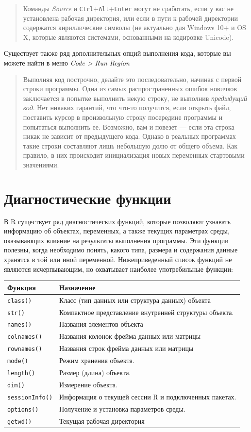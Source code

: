 \documentclass[]{book}
\begin{document}
\begin{quote}
Команды \emph{Source} и \texttt{Ctrl}+\texttt{Alt}+\texttt{Enter} могут
не сработать, если у вас не установлена рабочая директория, или если в
пути к рабочей директории содержатся кириллические символы (не актуально
для Windows 10+ и OS X, которые являются системами, основанными на
кодировке Unicode).
\end{quote}

Существует также ряд дополнительных опций выполнения кода, которые вы
можете найти в меню \emph{Code \textgreater{} Run Region}

\begin{quote}
Выполняя код построчно, делайте это последовательно, начиная с первой
строки программы. Одна из самых распространенных ошибок новичков
заключается в попытке выполнить некую строку, не выполнив
\emph{предыдущий код}. Нет никаких гарантий, что что-то получится, если
открыть файл, поставить курсор в произвольную строку посередине
программы и попытаться выполнить ее. Возможно, вам и повезет --- если
эта строка никак не зависит от предыдущего кода. Однако в реальных
программах такие строки составляют лишь небольшую долю от общего объема.
Как правило, в них происходит инициализация новых переменных стартовыми
значениями.
\end{quote}

\section*{Диагностические функции}\label{-}

В R существует ряд диагностических функций, которые позволяют узнавать
информацию об объектах, переменных, а также текущих параметрах среды,
оказывающих влияние на результаты выполнения программы. Эти функции
полезны, когда необходимо понять, какого типа, размера и содержания
данные хранятся в той или иной переменной. Нижеприведенный список
функций не являются исчерпывающим, но охватывает наиболее употребильные
функции:

\begin{longtable}[]{@{}ll@{}}
\toprule
Функция & Назначение\tabularnewline
\midrule
\endhead
\texttt{class()} & Класс (тип данных или структура данных)
объекта\tabularnewline
\texttt{str()} & Компактное представление внутренней структуры
объекта.\tabularnewline
\texttt{names()} & Названия элементов объекта\tabularnewline
\texttt{colnames()} & Названия колонок фрейма данных или
матрицы\tabularnewline
\texttt{rownames()} & Названия строк фрейма данных или
матрицы\tabularnewline
\texttt{mode()} & Режим хранения объекта.\tabularnewline
\texttt{length()} & Размер (длина) объекта.\tabularnewline
\texttt{dim()} & Измерение объекта.\tabularnewline
\texttt{sessionInfo()} & Информация о текущей сессии R и подключенных
пакетах.\tabularnewline
\texttt{options()} & Получение и установка параметров
среды.\tabularnewline
\texttt{getwd()} & Текущая рабочая директория\tabularnewline
\bottomrule
\end{longtable}
\end{document}
